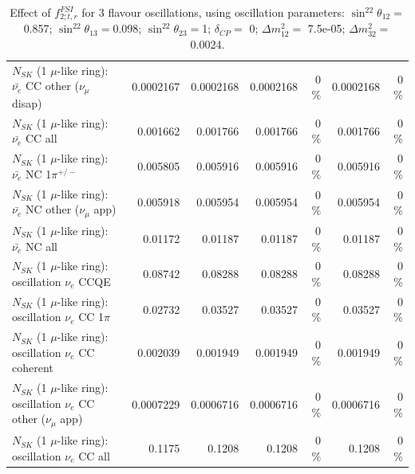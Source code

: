 \begin{table}
\begin{tabular}{| l | r | r | r  r | r  r |}
          $N_{SK}$ (1 $\mu$-like ring): $\bar{\nu_e}$ CC other ($\nu_\mu$ disap) &       0.0002167 &       0.0002168 &       0.0002168 &        0 \%  &       0.0002168 &        0 \%  \\ 
                            $N_{SK}$ (1 $\mu$-like ring): $\bar{\nu_{e}}$ CC all &        0.001662 &        0.001766 &        0.001766 &        0 \%  &        0.001766 &        0 \%  \\ 
\hline
                     $N_{SK}$ (1 $\mu$-like ring): $\bar{\nu_e}$ NC 1$\pi^{+/-}$ &        0.005805 &        0.005916 &        0.005916 &        0 \%  &        0.005916 &        0 \%  \\ 
            $N_{SK}$ (1 $\mu$-like ring): $\bar{\nu_e}$ NC other ($\nu_\mu$ app) &        0.005918 &        0.005954 &        0.005954 &        0 \%  &        0.005954 &        0 \%  \\ 
                            $N_{SK}$ (1 $\mu$-like ring): $\bar{\nu_{e}}$ NC all &         0.01172 &         0.01187 &         0.01187 &        0 \%  &         0.01187 &        0 \%  \\ 
\hline
\hline
\hline
                          $N_{SK}$ (1 $\mu$-like ring): oscillation $\nu_e$ CCQE &         0.08742 &         0.08288 &         0.08288 &        0 \%  &         0.08288 &        0 \%  \\ 
                     $N_{SK}$ (1 $\mu$-like ring): oscillation $\nu_e$ CC 1$\pi$ &         0.02732 &         0.03527 &         0.03527 &        0 \%  &         0.03527 &        0 \%  \\ 
                   $N_{SK}$ (1 $\mu$-like ring): oscillation $\nu_e$ CC coherent &        0.002039 &        0.001949 &        0.001949 &        0 \%  &        0.001949 &        0 \%  \\ 
      $N_{SK}$ (1 $\mu$-like ring): oscillation $\nu_e$ CC other ($\nu_\mu$ app) &       0.0007229 &       0.0006716 &       0.0006716 &        0 \%  &       0.0006716 &        0 \%  \\ 
                       $N_{SK}$ (1 $\mu$-like ring): oscillation $\nu_e$  CC all &          0.1175 &          0.1208 &          0.1208 &        0 \%  &          0.1208 &        0 \%  \\ 
\hline
\hline
\end{tabular}
\caption{ Effect of $f_{2; t, r}^{FSI}$ for 3 flavour oscillations, using oscillation parameters:  $\sin^22\theta_{12} = $0.857; $\sin^22\theta_{13} = $0.098; $\sin^22\theta_{23} = $1; $\delta_{CP} = $        0; $\Delta m^2_{12} = $    7.5e-05; $\Delta m^2_{32} = $    0.0024. }
\label{tab:num_fsi_002_1RmuT_3f_osc_t13:0.098_spectralreco_spectraltrue}
\end{table}
